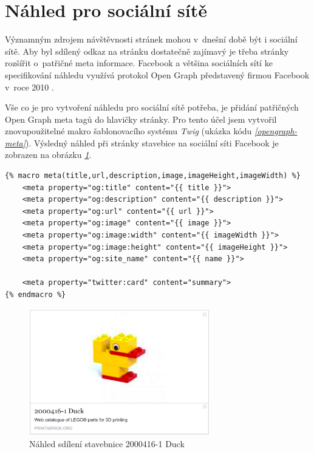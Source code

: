 \section{Náhled pro sociální sítě}
Významným zdrojem návštěvnosti stránek mohou v~dnešní době být i sociální sítě. Aby byl sdílený odkaz na stránku dostatečně zajímavý je třeba stránky rozšířit o~patřičné meta informace. Facebook a většina sociálních sítí ke specifikování náhledu využívá protokol Open Graph představený firmou Facebook v~roce 2010 \autocite{opengraph}.

Vše co je pro vytvoření náhledu pro sociální sítě potřeba, je přidání patřičných Open Graph meta tagů do hlavičky stránky. Pro tento účel jsem vytvořil znovupoužitelné makro šablonovacího systému \textit{Twig} (ukázka kódu \emph{\ref{opengraph-meta}}). Výsledný náhled při stránky stavebice na sociální síti Facebook je zobrazen na obrázku \emph{\ref{facebook-share}}. 

\begin{listing}[htbp]
  \begin{verbatim}
{% macro meta(title,url,description,image,imageHeight,imageWidth) %}
    <meta property="og:title" content="{{ title }}">
    <meta property="og:description" content="{{ description }}">
    <meta property="og:url" content="{{ url }}">
    <meta property="og:image" content="{{ image }}">
    <meta property="og:image:width" content="{{ imageWidth }}">
    <meta property="og:image:height" content="{{ imageHeight }}">
    <meta property="og:site_name" content="{{ name }}">

    <meta property="twitter:card" content="summary">
{% endmacro %}
  \end{verbatim}
  \caption{\textit{Twig} makro pro přidání Open Graph meta tagů\label{opengraph-meta}}
\end{listing}

\begin{figure}[htbp]
      \centering
      \includegraphics[width=0.7\textwidth,height=\textheight,keepaspectratio]{images/fbshare.png}
      \caption{Náhled sdílení stavebnice 2000416-1 Duck\label{facebook-share}}
\end{figure}